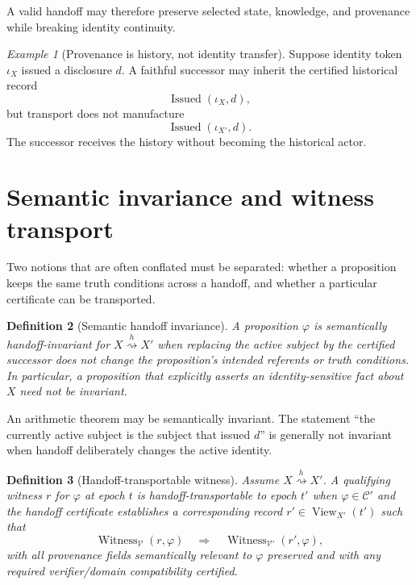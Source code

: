 \documentclass[11pt]{article}
\newtheorem{definition}{Definition}[section]
\theoremstyle{remark}
\newtheorem{example}[definition]{Example}
\newcommand{\View}{\operatorname{View}}
\newcommand{\Witness}{\operatorname{Witness}}
\newcommand{\Issued}{\operatorname{Issued}}
\newcommand{\handoff}{\mathrel{\overset{h}{\rightsquigarrow}}}
\begin{document}
A valid handoff may therefore preserve selected state, knowledge, and provenance while breaking identity continuity.

\begin{example}[Provenance is history, not identity transfer]
Suppose identity token $\iota_X$ issued a disclosure $d$. A faithful successor may inherit the certified historical record
\[
\Issued(\iota_X,d),
\]
but transport does not manufacture
\[
\Issued(\iota_{X'},d).
\]
The successor receives the history without becoming the historical actor.
\end{example}

\section{Semantic invariance and witness transport}

Two notions that are often conflated must be separated: whether a proposition keeps the same truth conditions across a handoff, and whether a particular certificate can be transported.

\begin{definition}[Semantic handoff invariance]
A proposition $\varphi$ is \emph{semantically handoff-invariant} for $X\handoff X'$ when replacing the active subject by the certified successor does not change the proposition's intended referents or truth conditions. In particular, a proposition that explicitly asserts an identity-sensitive fact about $X$ need not be invariant.
\end{definition}

An arithmetic theorem may be semantically invariant. The statement ``the currently active subject is the subject that issued $d$'' is generally not invariant when handoff deliberately changes the active identity.

\begin{definition}[Handoff-transportable witness]
Assume $X\handoff X'$. A qualifying witness $r$ for $\varphi$ at epoch $t$ is \emph{handoff-transportable to epoch $t'$} when $\varphi\in\mathcal C'$ and the handoff certificate establishes a corresponding record $r'\in\View_{X'}(t')$ such that
\[
\Witness_{\mathcal V}(r,\varphi)
\quad\Longrightarrow\quad
\Witness_{\mathcal V'}(r',\varphi),
\]
with all provenance fields semantically relevant to $\varphi$ preserved and with any required verifier/domain compatibility certified.
\end{definition}
\end{document}
